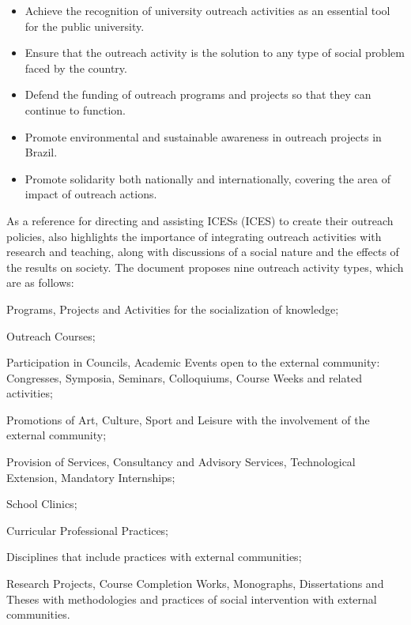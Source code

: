 \begin{itemize}
    \item Achieve the recognition of university outreach activities as an essential tool for the public university.
    \item Ensure that the outreach activity is the solution to any type of social problem faced by the country.
    \item Defend the funding of outreach programs and projects so that they can continue to function.
    \item Promote environmental and sustainable awareness in outreach projects in Brazil.
    \item Promote solidarity both nationally and internationally, covering the area of impact of outreach actions.
\end{itemize}

As a reference for directing and assisting \aclp{ICES} (\ac{ICES}) to create their outreach policies, \cite{referenciaisPolitica} also highlights the importance of integrating outreach activities with research and teaching, along with discussions of a social nature and the effects of the results on society. The document proposes nine outreach activity types, which are as follows:

\begin{inparaenum}[(1)]
    \item Programs, Projects and Activities for the socialization of knowledge;
    \item Outreach Courses;
    \item Participation in Councils, Academic Events open to the external community: Congresses, Symposia, Seminars, Colloquiums, Course Weeks and related activities;
    \item Promotions of Art, Culture, Sport and Leisure with the involvement of the external community;
    \item Provision of Services, Consultancy and Advisory Services, Technological Extension, Mandatory Internships;
    \item School Clinics;
    \item Curricular Professional Practices;
    \item Disciplines that include practices with external communities;
    \item Research Projects, Course Completion Works,
    Monographs, Dissertations and Theses with methodologies and practices of social intervention with external communities.
\end{inparaenum}

